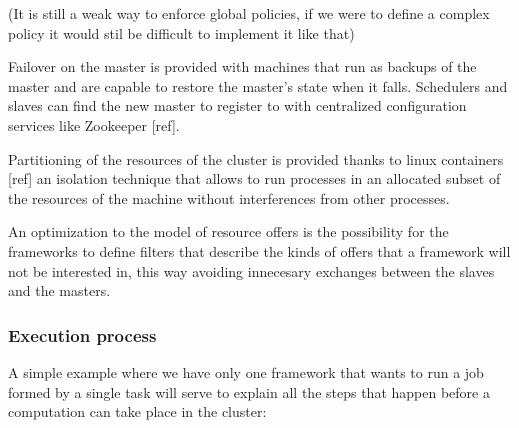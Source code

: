 \documentclass{svjour3}                     %
\begin{document}
(It is still a weak way to enforce global policies, if we were to define a complex
policy it would stil be difficult to implement it like that)

Failover on the master is provided with machines that run as backups of the master and
are capable to restore the master's state when it falls. Schedulers and slaves can find
the new master to register to with centralized configuration services like Zookeeper [ref].

Partitioning of the resources of the cluster is provided thanks to linux containers [ref]
an isolation technique that allows to run processes in an allocated subset of the 
resources of the machine without interferences from other processes. 

An optimization to the model of resource offers is the possibility for the frameworks
to define filters that describe the kinds of offers that a framework will not be interested
in, this way avoiding innecesary exchanges between the slaves and the masters.

\subsubsection{Execution process}

A simple example where we have only one framework that wants to run a 
job formed by a single task will serve to explain all the steps that happen
before a computation can take place in the cluster:
\end{document}
